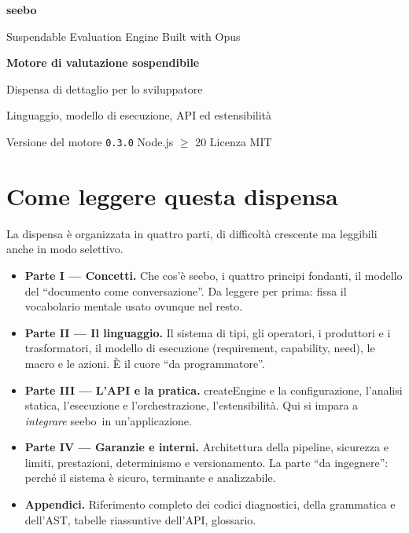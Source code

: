 \documentclass[11pt,a4paper]{book}
\newcommand{\ic}[1]{{\ttfamily #1}}
\theoremstyle{definition}
\newcommand{\seebo}{\textsf{seebo}}
\begin{document}
\frontmatter

\begin{titlepage}
\centering
\vspace*{3cm}
{\Huge\bfseries seebo\par}
\vspace{0.5cm}
{\large Suspendable Evaluation Engine Built with Opus\par}
\vspace{2.5cm}
{\LARGE\bfseries Motore di valutazione sospendibile\par}
\vspace{0.6cm}
{\Large Dispensa di dettaglio per lo sviluppatore\par}
\vspace{1cm}
{\large Linguaggio, modello di esecuzione, API ed estensibilità\par}
\vfill
{Versione del motore \texttt{0.3.0} \quad Node.js $\geq$ 20 \quad Licenza MIT\par}
\vspace{1.5cm}
\end{titlepage}

\chapter*{Come leggere questa dispensa}

La dispensa è organizzata in quattro parti, di difficoltà crescente ma
leggibili anche in modo selettivo.

\begin{itemize}
  \item \textbf{Parte I --- Concetti.} Che cos'è \seebo, i quattro principi
    fondanti, il modello del ``documento come conversazione''. Da leggere per
    prima: fissa il vocabolario mentale usato ovunque nel resto.
  \item \textbf{Parte II --- Il linguaggio.} Il sistema di tipi, gli operatori,
    i produttori e i trasformatori, il modello di esecuzione (requirement,
    capability, need), le macro e le azioni. È il cuore ``da programmatore''.
  \item \textbf{Parte III --- L'API e la pratica.} \ic{createEngine} e la
    configurazione, l'analisi statica, l'esecuzione e l'orchestrazione,
    l'estensibilità. Qui si impara a \emph{integrare} \seebo\ in
    un'applicazione.
  \item \textbf{Parte IV --- Garanzie e interni.} Architettura della pipeline,
    sicurezza e limiti, prestazioni, determinismo e versionamento. La parte
    ``da ingegnere'': perché il sistema è sicuro, terminante e analizzabile.
  \item \textbf{Appendici.} Riferimento completo dei codici diagnostici, della
    grammatica e dell'AST, tabelle riassuntive dell'API, glossario.
\end{itemize}
\end{document}

